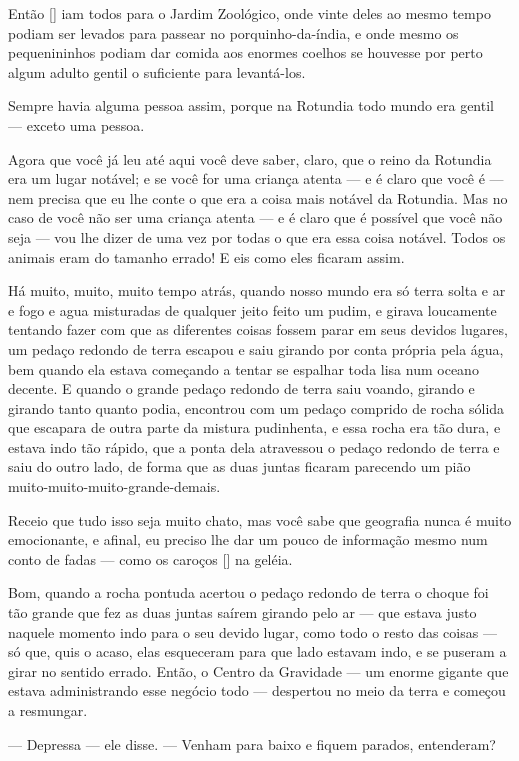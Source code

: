 Então [] iam todos para o Jardim Zoológico, onde vinte deles ao mesmo
tempo podiam ser levados para passear no porquinho-da-índia, e onde
mesmo os pequenininhos podiam dar comida aos enormes coelhos se
houvesse por perto algum adulto gentil o suficiente para levantá-los.

Sempre havia alguma pessoa assim, porque na Rotundia todo mundo era
gentil — exceto uma pessoa.

Agora que você já leu até aqui você deve saber, claro, que o reino da
Rotundia era um lugar notável; e se você for uma criança atenta — e é
claro que você é — nem precisa que eu lhe conte o que era a coisa
mais notável da Rotundia. Mas no caso de você não ser uma criança
atenta — e é claro que é possível que você não seja — vou lhe dizer
de uma vez por todas o que era essa coisa notável. Todos os animais
eram do tamanho errado! E eis como eles ficaram assim.

Há muito, muito, muito tempo atrás, quando nosso mundo era só terra
solta e ar e fogo e agua misturadas de qualquer jeito feito um pudim,
e girava loucamente tentando fazer com que as diferentes coisas
fossem parar em seus devidos lugares, um pedaço redondo de terra
escapou e saiu girando por conta própria pela água, bem quando ela
estava começando a tentar se espalhar toda lisa num oceano decente. E
quando o grande pedaço redondo de terra saiu voando, girando e
girando tanto quanto podia, encontrou com um pedaço comprido de rocha
sólida que escapara de outra parte da mistura pudinhenta, e essa
rocha era tão dura, e estava indo tão rápido, que a ponta dela
atravessou o pedaço redondo de terra e saiu do outro lado, de forma
que as duas juntas ficaram parecendo um pião
muito-muito-muito-grande-demais.

Receio que tudo isso seja muito chato, mas você sabe que geografia
nunca é muito emocionante, e afinal, eu preciso lhe dar um pouco de
informação mesmo num conto de fadas — como os caroços [] na geléia.

Bom, quando a rocha pontuda acertou o pedaço redondo de terra o choque
foi tão grande que fez as duas juntas saírem girando pelo ar — que
estava justo naquele momento indo para o seu devido lugar, como todo
o resto das coisas — só que, quis o acaso, elas esqueceram para que
lado estavam indo, e se puseram a girar no sentido errado. Então, o
Centro da Gravidade — um enorme gigante que estava administrando esse
negócio todo — despertou no meio da terra e começou a resmungar.

— Depressa — ele disse. — Venham para baixo e fiquem parados,
entenderam?

